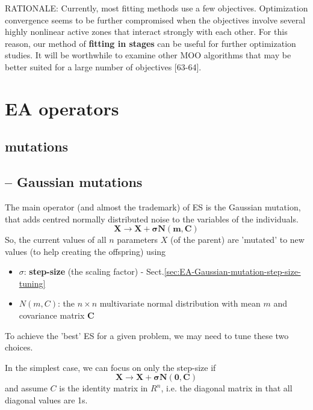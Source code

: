 RATIONALE: Currently, most fitting methods use a few objectives.
Optimization convergence seems to be further compromised when the objectives
involve several highly nonlinear active zones that interact strongly with each
other. For this reason, our method of {\bf fitting in stages} can be useful for
further optimization studies. It will be worthwhile to examine other MOO
algorithms that may be better suited for a large number of objectives [63-64].

\section{EA operators}

\subsection{mutations}

\subsection{-- Gaussian mutations}

The main operator (and almost the trademark) of ES is the Gaussian mutation,
that adds centred normally distributed noise to the variables of the
individuals.
\begin{equation}
\mathbf{X \rightarrow X + \sigma N(m,C)}
\end{equation}
So, the current values of all $n$ parameters $X$ (of the parent) are 'mutated'
to new values (to help creating the offspring) using

\begin{itemize}
  \item $\sigma$: {\bf step-size} (the scaling factor) -
  Sect.\ref{sec:EA-Gaussian-mutation-step-size-tuning}

  \item $N(m,C)$: the $n \times n$ multivariate normal distribution with mean
  $m$ and covariance matrix $\mathbf{C}$
\end{itemize}
To achieve the 'best' ES for a given problem, we may need to tune
these two choices.

In the simplest case, we can focus on only the step-size if
\begin{equation}
\mathbf{X \rightarrow X + \sigma N(0,C)}
\end{equation}
and assume $C$ is the identity matrix in $R^n$, i.e. the diagonal matrix in that
all diagonal values are 1s.

